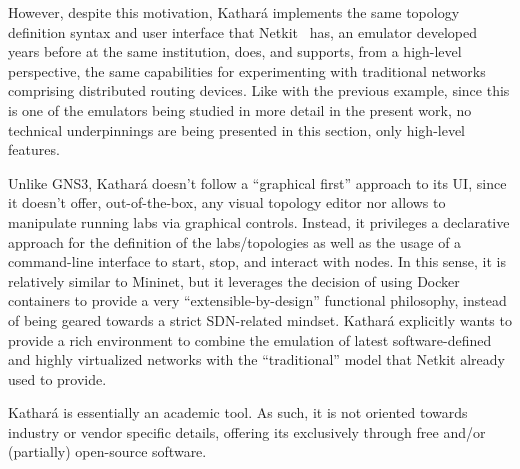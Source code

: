 However, despite this motivation, Kathará implements the same topology definition syntax and user interface that Netkit~\cite{netkit-short} has, an emulator developed years before at the same institution, does, and supports, from a high-level perspective, the same capabilities for experimenting with traditional networks comprising distributed routing devices.
Like with the previous example, since this is one of the emulators being studied in more detail in the present work, no technical underpinnings are being presented in this section, only high-level features.

Unlike GNS3, Kathará doesn't follow a ``graphical first'' approach to its UI, since it doesn't offer, out-of-the-box, any visual topology editor nor allows to manipulate running labs via graphical controls.
Instead, it privileges a declarative approach for the definition of the labs/topologies as well as the usage of a command-line interface to start, stop, and interact with nodes.
In this sense, it is relatively similar to Mininet, but it leverages the decision of using Docker containers to provide a very ``extensible-by-design'' functional philosophy, instead of being geared towards a strict SDN-related mindset.
Kathará explicitly wants to provide a rich environment to combine the emulation of latest software-defined and highly virtualized networks with the ``traditional'' model that Netkit already used to provide.

Kathará is essentially an academic tool.
As such, it is not oriented towards industry or vendor specific details, offering its exclusively through free and/or (partially) open-source software.

